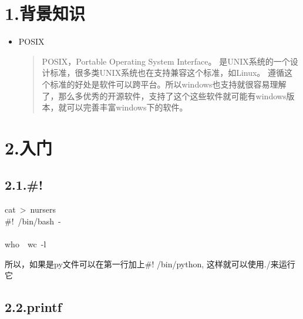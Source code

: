 \documentclass{article}
\begin{document}
\mdxtitleblockstart{}
\mdxauthorstart{}
\mdxauthorend\mdtitleauthorrunning{}{}\mdxtitleblockend%

\section{1.\hspace*{0.5em}背景知识}\label{section}%

\begin{itemize}[noitemsep,topsep=\mdcompacttopsep]%

\item POSIX

\begin{quote}%
POSIX，Portable Operating System Interface。\mdbr
是UNIX系统的一个设计标准，很多类UNIX系统也在支持兼容这个标准，如Linux。\mdbr
遵循这个标准的好处是软件可以跨平台。所以windows也支持就很容易理解了，那么多优秀的开源软件，支持了这个这些软件就可能有windows版本，就可以完善丰富windows下的软件。
\end{quote}%
\end{itemize}%

\section{2.\hspace*{0.5em}入门}\label{section}%

\subsection{2.1.\hspace*{0.5em}\#!}\label{section}%
\begin{mdpre}%
\noindent{}cat~\textgreater{}~nursers\\
\#!~/bin/bash~-\\
\\
who~\textbar{}~wc~-l%
\end{mdpre}
所以，如果是py文件可以在第一行加上\#! /bin/python, 这样就可以使用./来运行它

\subsection{2.2.\hspace*{0.5em}printf}\label{sec-printf}%
\end{document}
